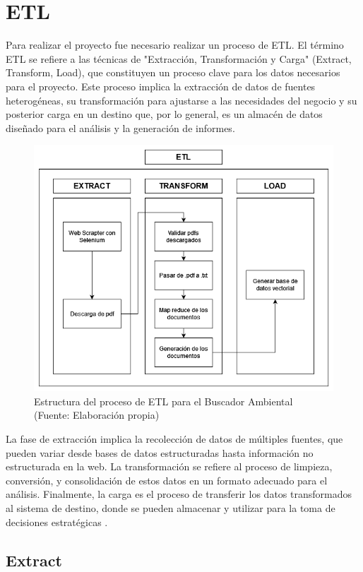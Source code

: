 \section{ETL}


Para realizar el proyecto fue necesario realizar un proceso de ETL. El término ETL se refiere a las técnicas de "Extracción, 
Transformación y Carga" (Extract, Transform, Load), que constituyen un proceso clave para los datos necesarios para el proyecto. 
Este proceso implica la extracción de datos de fuentes heterogéneas, su transformación para ajustarse a las necesidades del 
negocio y su posterior carga en un destino que, por lo general, es un almacén de datos diseñado para el análisis y la generación 
de informes\cite{ETL1}.

\begin{figure}[ht!]
    \centering
    \includegraphics[width=.5\textwidth]{figures/huemulETL.png}
    \caption[Estructura del proceso de ETL para el Buscador Ambiental]{Estructura del proceso de ETL para el Buscador Ambiental\\
    {\scriptsize (Fuente: Elaboración propia)}}
    \label{fig:etl1}
\end{figure}
    

La fase de extracción implica la recolección de datos de múltiples fuentes, que pueden variar desde bases de datos 
estructuradas hasta información no estructurada en la web. La transformación se refiere al proceso de limpieza, conversión, 
y consolidación de estos datos en un formato adecuado para el análisis. Finalmente, la carga es el proceso de transferir 
los datos transformados al sistema de destino, donde se pueden almacenar y utilizar para la toma de decisiones estratégicas 
\cite{ETL1}.

\subsection{Extract}


